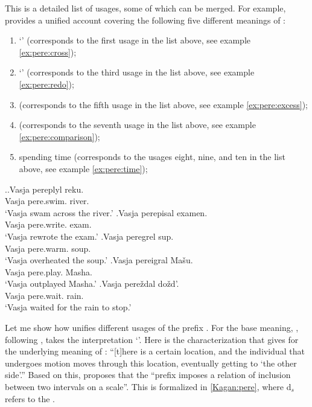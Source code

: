 This is a detailed list of  usages, some of which can be merged. For example, \citet[119--125]{Kagan:book} provides a unified account covering the following five different meanings of : 
\begin{enumerate}
\item `' (corresponds to the first usage in the list above, see example \ref{ex:pere:cross});
\item `' (corresponds to the third usage in the list above, see example \ref{ex:pere:redo});
\item {} (corresponds to the fifth usage in the list above, see example \ref{ex:pere:excess});
\item {} (corresponds to the seventh usage in the list above, see example \ref{ex:pere:comparison});
\item spending time (corresponds to the usages eight, nine, and ten in the list above, see example \ref{ex:pere:time});
\end{enumerate}

\ex.\label{ex:pere}\ag.\label{ex:pere:cross}Vasja pereplyl reku.\\
Vasja pere.swim. river.\\
\trans `Vasja swam across the river.'
\bg.\label{ex:pere:redo}Vasja perepisal examen.\\
Vasja pere.write. exam.\\
\trans `Vasja rewrote the exam.'
\bg.\label{ex:pere:excess}Vasja peregrel sup.\\
Vasja pere.warm. soup.\\
\trans `Vasja overheated the soup.'
\bg.\label{ex:pere:comparison}Vasja pereigral Ma\v{s}u.\\
Vasja pere.play. Masha.\\
\trans `Vasja outplayed Masha.'
\bg.\label{ex:pere:time}Vasja pere\v{z}dal do\v{z}d'.\\
Vasja pere.wait. rain.\\
\trans `Vasja waited for the rain to stop.'

Let me show how \citet{Kagan:book} unifies different usages of the prefix . For the base meaning, \citet[120--121]{Kagan:book}, following \citet{Janda:88}, takes the  interpretation `'. Here is the characterization that \citet[121]{Kagan:book} gives for the underlying meaning of : ``[t]here is a certain  location, and the individual that undergoes motion moves through this location, eventually getting to `the other side'.'' Based on this, \citet[122]{Kagan:book} proposes that the ``prefix imposes a relation of inclusion between two intervals on a scale''. This is formalized in \ref{Kagan:pere}, where d$_s$ refers to the  .

